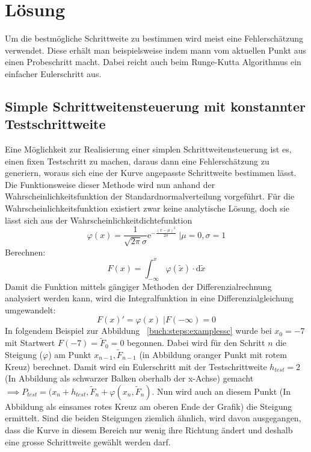 %
%
%
\section{Lösung
  \label{steps:section:loesung}}
Um die bestmögliche Schrittweite zu bestimmen wird meist eine Fehlerschätzung verwendet.
Diese erhält man beispielsweise indem mann vom aktuellen Punkt aus einen Probeschritt macht.
Dabei reicht auch beim Runge-Kutta Algorithmus ein einfacher Eulerschritt aus.

\subsection{Simple Schrittweitensteuerung mit konstannter Testschrittweite
  \label{steps:subsection:simplestep}}
  Eine Möglichkeit zur Realisierung einer simplen Schrittweitensteuerung ist es, einen fixen Testschritt zu machen, 
  daraus dann eine Fehlerschätzung zu generiern, woraus sich eine der Kurve angepasste Schrittweite bestimmen lässt.
  Die Funktionsweise dieser Methode wird nun anhand der Wahrscheinlichkeitsfunktion der Standardnormalverteilung vorgeführt.
  Für die Wahrscheinlichkeitsfunktion existiert zwar keine analytische Lösung,
  doch sie lässt sich aus der Wahrscheinlichkeitdichtefunktion
  \[
    \varphi(x)=\frac{1}{\sqrt{2\pi}\sigma}\mathrm{e}^{-\frac{(x-\mu)^2}{2 \sigma}}\;|\mu=0,\sigma=1
  \]
  Berechnen:
  \[
    F(x)=\int_{-\infty}^{x} \varphi (\tilde{x}) \cdot \mathrm{d} \tilde{x}
  \]
  Damit die Funktion mittels gängiger Methoden der Differenzialrechnung analysiert werden kann,
  wird die Integralfunktion in eine Differenzialgleichung umgewandelt:
  \[
    F(x)'=\varphi(x)\;|F(-\infty)=0
  \]
  In folgendem Beispiel zur Abbildung ~\ref{buch:steps:examplessc} wurde bei $x_0=-7$ mit Startwert $F(-7)=\tilde{F}_0=0$ begonnen.
  Dabei wird für den Schritt $n$ die Steigung ($\varphi$) am Punkt $x_{n-1}, \tilde{F}_{n-1}$ (in Abbildung oranger Punkt mit rotem Kreuz) berechnet.
  Damit wird ein Eulerschritt mit der Testschrittweite $h_{test}=2$ (In Abbildung als schwarzer Balken oberhalb der x-Achse) gemacht $\implies P_{test}=(x_n+h_{test}, \tilde{F}_n+\varphi(x_n, \tilde{F}_n)$.
  Nun wird auch an diesem Punkt (In Abbildung als einsames rotes Kreuz am oberen Ende der Grafik) die Steigung ermittelt.
  Sind die beiden Steigungen ziemlich ähnlich, wird davon ausgegangen,
  dass die Kurve in diesem Bereich nur wenig ihre Richtung ändert und deshalb eine grosse Schrittweite gewählt werden darf.
